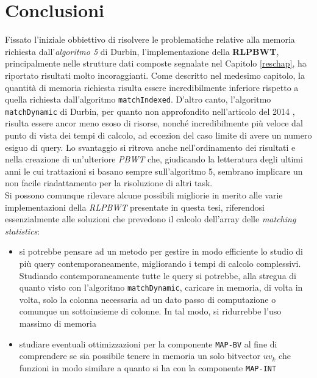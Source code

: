 \documentclass[a4paper,12pt, oneside, draft]{book}
\begin{document}
%


\chapter{Conclusioni}
\label{conchap}
Fissato l'iniziale obbiettivo di risolvere le problematiche relative alla
memoria richiesta dall'\textit{algoritmo 5} di Durbin, l'implementazione della
\textbf{RLPBWT}, principalmente nelle strutture dati composte segnalate nel
Capitolo \ref{reschap}, ha riportato risultati molto incoraggianti. Come
descritto nel medesimo capitolo, la quantità di memoria richiesta risulta essere 
incredibilmente inferiore rispetto a quella richiesta dall'algoritmo
\texttt{matchIndexed}. D'altro canto, l'algoritmo \texttt{matchDynamic} di 
Durbin, per quanto non approfondito nell'articolo del 2014 \cite{pbwt}, risulta
essere ancor meno esoso di risorse, nonché incredibilmente più veloce dal punto
di vista dei tempi di calcolo, ad eccezion del caso limite di avere un numero
esiguo di query. Lo svantaggio si ritrova anche nell'ordinamento dei risultati
e nella creazione di un'ulteriore \textit{PBWT}
che, giudicando la letteratura degli ultimi anni le cui trattazioni si basano
sempre sull'algoritmo 5, sembrano implicare un non facile 
riadattamento per la risoluzione di altri task.\\
Si possono comunque rilevare alcune possibili migliorie in merito
alle varie implementazioni della \textit{RLPBWT} presentate in questa tesi,
riferendosi essenzialmente alle soluzioni che prevedono il calcolo
dell'array delle \textit{matching statistics}: 
\begin{itemize}
  \item si potrebbe pensare ad un metodo per gestire in modo efficiente lo
  studio di più query contemporaneamente, migliorando i tempi di calcolo
  complessivi. Studiando contemporaneamente tutte le query si potrebbe, alla
  stregua di quanto visto con l'algoritmo \texttt{matchDynamic}, caricare in
  memoria, di volta in volta, solo la 
  colonna necessaria ad un dato passo di computazione o comunque un sottoinsieme
  di colonne. In tal modo, si ridurrebbe l'uso massimo di memoria 
  \item studiare eventuali ottimizzazioni per la componente \texttt{MAP-BV} al
  fine di comprendere se sia possibile tenere in
  memoria un solo bitvector $uv_k$ che funzioni in modo similare a quanto si ha
  con la componente \texttt{MAP-INT}
\end{itemize}
\end{document}
